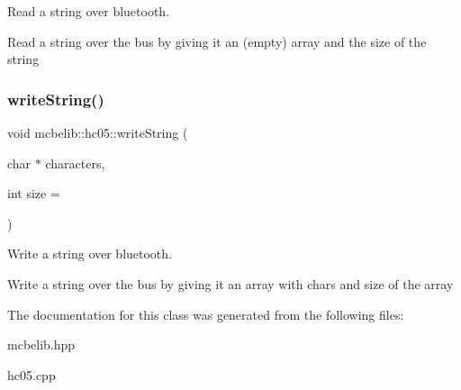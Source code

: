 Read a string over bluetooth. 

Read a string over the bus by giving it an (empty) array and the size of the string \mbox{\label{classmcbelib_1_1hc05_a3cd0be8d16a5eb990216b41e533b815c}} 
\subsubsection{\texorpdfstring{write\+String()}{writeString()}}
{\footnotesize\ttfamily void mcbelib\+::hc05\+::write\+String (\begin{DoxyParamCaption}\item[{char $\ast$}]{characters,  }\item[{int}]{size = {} }\end{DoxyParamCaption})}



Write a string over bluetooth. 

Write a string over the bus by giving it an array with chars and size of the array 

The documentation for this class was generated from the following files\+:\begin{DoxyCompactItemize}
\item 
mcbelib.\+hpp\item 
hc05.\+cpp\end{DoxyCompactItemize}
